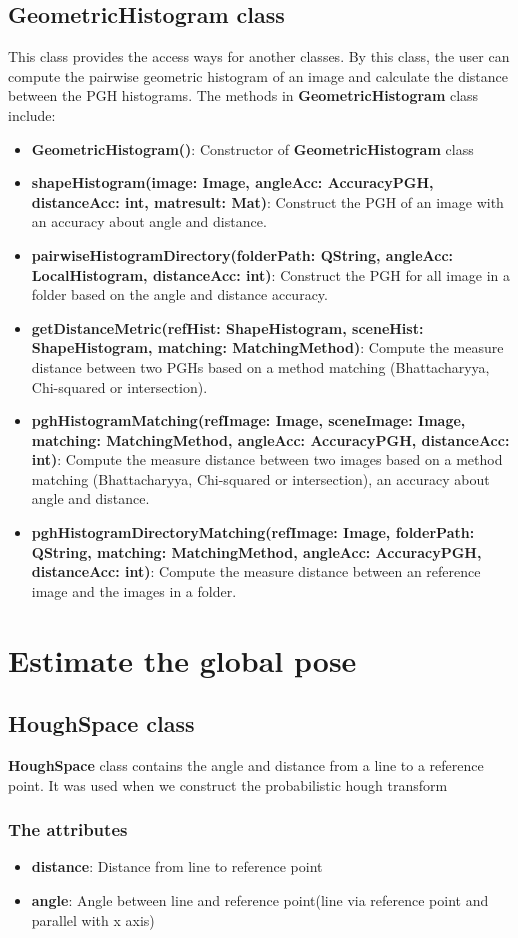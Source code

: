 \subsection{GeometricHistogram class}
This class provides the access ways for another classes. By this class, the user can compute the pairwise geometric histogram of an image and calculate the distance between the PGH histograms. The methods in \textbf{GeometricHistogram} class include:
\begin{itemize}
\item\textbf{GeometricHistogram()}: Constructor of \textbf{GeometricHistogram} class
\item\textbf{shapeHistogram(image: Image, angleAcc: AccuracyPGH, distanceAcc: int, matresult: Mat)}: Construct the PGH of an image with an accuracy about angle and distance.
\item\textbf{pairwiseHistogramDirectory(folderPath: QString, angleAcc: LocalHistogram, distanceAcc: int)}: Construct the PGH for all image in a folder based on the angle and distance accuracy.
\item\textbf{getDistanceMetric(refHist: ShapeHistogram, sceneHist: ShapeHistogram, matching: MatchingMethod)}: Compute the measure distance between two PGHs based on a method matching (Bhattacharyya, Chi-squared or intersection).
\item\textbf{pghHistogramMatching(refImage: Image, sceneImage: Image, matching: MatchingMethod, angleAcc: AccuracyPGH, distanceAcc: int)}: Compute the measure distance between two images based on a method matching (Bhattacharyya, Chi-squared or intersection), an accuracy about angle and distance.
\item\textbf{pghHistogramDirectoryMatching(refImage: Image, folderPath: QString, matching: MatchingMethod, angleAcc: AccuracyPGH, distanceAcc: int)}: Compute the measure distance between an reference image and the images in a folder.
\end{itemize}
\section{Estimate the global pose}
\subsection{HoughSpace class}
\textbf{HoughSpace} class contains the angle and distance from a line to a reference point. It was used when we construct the probabilistic hough transform
\subsubsection{The attributes}
\begin{itemize}
\item\textbf{distance}: Distance from line to reference point
\item\textbf{angle}: Angle between line and reference point(line via reference point and parallel with x axis)
\end{itemize}
